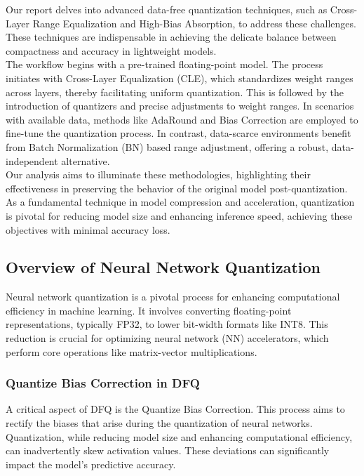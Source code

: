 \documentclass[10pt]{article}
\begin{document}
Our report delves into advanced data-free quantization techniques, such as Cross-Layer Range Equalization and High-Bias Absorption, to address these challenges. These techniques are indispensable in achieving the delicate balance between compactness and accuracy in lightweight models.\\

The workflow begins with a pre-trained floating-point model. The process initiates with Cross-Layer Equalization (CLE), which standardizes weight ranges across layers, thereby facilitating uniform quantization. This is followed by the introduction of quantizers and precise adjustments to weight ranges. In scenarios with available data, methods like AdaRound and Bias Correction are employed to fine-tune the quantization process. In contrast, data-scarce environments benefit from Batch Normalization (BN) based range adjustment, offering a robust, data-independent alternative.\\

Our analysis aims to illuminate these methodologies, highlighting their effectiveness in preserving the behavior of the original model post-quantization. As a fundamental technique in model compression and acceleration, quantization is pivotal for reducing model size and enhancing inference speed, achieving these objectives with minimal accuracy loss.

\subsection{Overview of Neural Network Quantization}

Neural network quantization is a pivotal process for enhancing computational efficiency in machine learning. It involves converting floating-point representations, typically FP32, to lower bit-width formats like INT8. This reduction is crucial for optimizing neural network (NN) accelerators, which perform core operations like matrix-vector multiplications.

\subsubsection{Quantize Bias Correction in DFQ}

A critical aspect of DFQ is the Quantize Bias Correction. This process aims to rectify the biases that arise during the quantization of neural networks. Quantization, while reducing model size and enhancing computational efficiency, can inadvertently skew activation values. These deviations can significantly impact the model's predictive accuracy.
\end{document}
